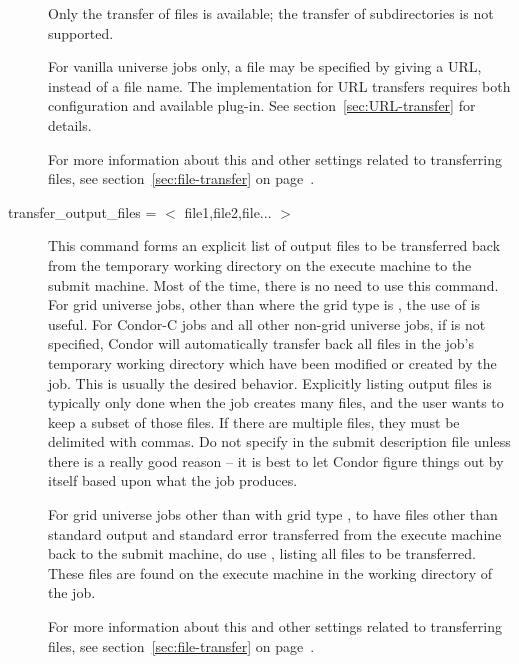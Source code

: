 \begin{description}
Only the transfer of files is available; the transfer of
subdirectories is not supported.

For vanilla universe jobs only,
a file may be specified by giving a URL, instead of a file name.
The implementation for URL transfers requires both configuration
and available plug-in.  See section~\ref{sec:URL-transfer} for details. 
 
For more information about this and other settings related to
transferring files, see section~\ref{sec:file-transfer} on
page~\pageref{sec:file-transfer}.


\item[transfer\_output\_files = $<$ file1,file2,file... $>$]
This command forms an explicit list of output files to be transferred
back from the temporary working directory on the execute machine to
the submit machine.
Most of the time, there is no need to use this command.
For grid universe jobs, other than where the grid type is ,
the use of  is useful.
For Condor-C jobs and all other non-grid universe jobs,
if  is not specified,
Condor will automatically transfer back all files in the job's
temporary working directory which have been
modified or created by the job.
This is usually the desired behavior.
Explicitly listing output files is typically only done when the job creates
many files, and the user wants to keep a subset of
those files.
If there are multiple files, they must be delimited with commas.
\Warn Do not specify  in the
submit description file unless there is a really good reason -- it is
best to let Condor figure things out by itself based upon what
the job produces.

For grid universe jobs other than with grid type ,
to have files other than standard output and standard error transferred
from the execute machine back to the submit machine,
do use , listing
all files to be transferred.
These files are found on the execute machine in the
working directory of the job.

For more information about this and other settings related to
transferring files, see section~\ref{sec:file-transfer} on
page~\pageref{sec:file-transfer}.



\end{description}
